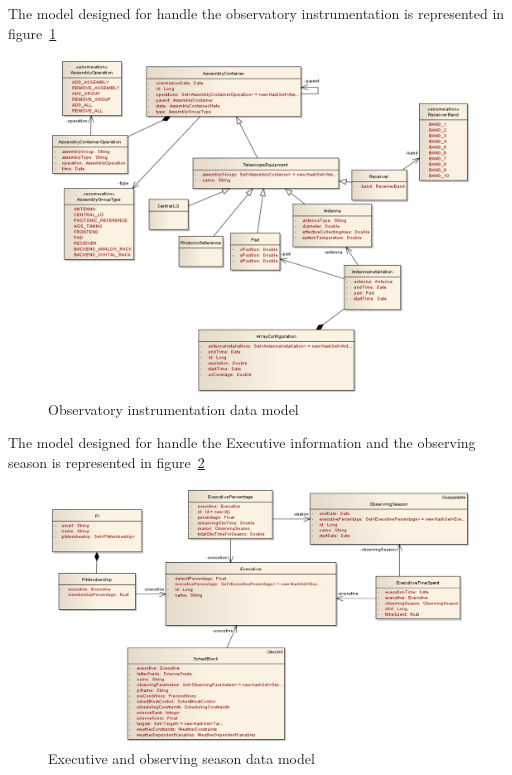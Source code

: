 The model designed for handle the observatory instrumentation is represented in figure~\ref{fig:datamodel-observatory}

\begin{figure}[]	
\begin{center}
\includegraphics[width=\textwidth]{images/Observatory}
\caption{Observatory instrumentation data model}
\end{center}
\label{fig:datamodel-observatory}
\end{figure}

The model designed for handle the Executive information and the observing season is represented in figure~\ref{fig:datamodel-executive}

\begin{figure}[]	
\begin{center}
\includegraphics[width=\textwidth]{images/Executive}
\caption{Executive and observing season data model}
\end{center}
\label{fig:datamodel-executive}
\end{figure}

